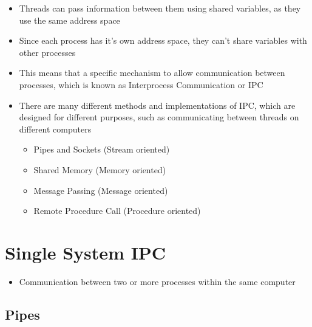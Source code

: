 
\begin{itemize}
  \item Threads can pass information between them using shared variables, as they use the same address space
  \item Since each process has it's own address space, they can't share variables with other processes
  \item This means that a specific mechanism to allow communication between processes, which is known as Interprocess Communication or IPC
  \item There are many different methods and implementations of IPC, which are designed for different purposes, such as communicating between threads on different computers
  \begin{itemize}
    \item Pipes and Sockets (Stream oriented)
    \item Shared Memory (Memory oriented)
    \item Message Passing (Message oriented)
    \item Remote Procedure Call (Procedure oriented)
  \end{itemize}
\end{itemize}

\section*{Single System IPC}

\begin{itemize}
  \item Communication between two or more processes within the same computer
\end{itemize}

\subsection*{Pipes}

